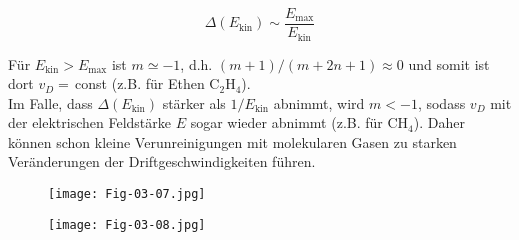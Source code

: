 \[\Delta(E_\text{kin}) \sim \frac{E_\text{max}}{E_\text{kin}}  \]

Für $E_\text{kin}>E_\text{max}$ ist $m\simeq -1$, d.h. $(m+1)/(m+2n+1)\approx 0$ und somit ist dort
$v_D=\,$const (z.B. für Ethen C$_2$H$_4$).
\\
Im Falle, dass $\Delta(E_\text{kin})$ stärker als $1/E_\text{kin}$ abnimmt, wird $m<-1$, sodass
$v_D$ mit der elektrischen Feldstärke $E$ sogar wieder abnimmt (z.B. für CH$_4$). Daher können schon
kleine Verunreinigungen mit molekularen Gasen zu starken Veränderungen der Driftgeschwindigkeiten
führen.

\begin{figure}[H]
	\centering
	\texttt{[image: Fig-03-07.jpg]}
\end{figure}

\begin{figure}[H]
	\centering
	\texttt{[image: Fig-03-08.jpg]}
\end{figure}
